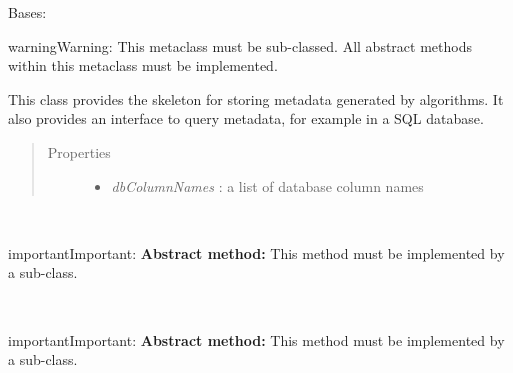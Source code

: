 \documentclass[letterpaper,10pt,english]{sphinxmanual}
\begin{document}
\begin{fulllineitems}
\label{api-doc/mosaic.meta:mosaic.metaMDIO.metaMDIO}
Bases: \href{http://docs.python.org/library/functions.html\#object}{}

\begin{notice}{warning}{Warning:}
This metaclass must be sub-classed. All abstract methods within this metaclass must be implemented.
\end{notice}

This class provides the skeleton for storing metadata
generated by algorithms. It also provides an interface to query metadata, for example in a 
SQL database.
\begin{quote}\begin{description}
\item[{Properties}] \leavevmode\begin{itemize}
\item {} 
\emph{dbColumnNames} : a list of database column names

\end{itemize}

\end{description}\end{quote}

\begin{fulllineitems}
\label{api-doc/mosaic.meta:mosaic.metaMDIO.metaMDIO._opendb}~
\begin{notice}{important}{Important:}
\textbf{Abstract method:} This method must be implemented by a sub-class.
\end{notice}

\end{fulllineitems}


\begin{fulllineitems}
\label{api-doc/mosaic.meta:mosaic.metaMDIO.metaMDIO._initdb}~
\begin{notice}{important}{Important:}
\textbf{Abstract method:} This method must be implemented by a sub-class.
\end{notice}

\end{fulllineitems}


\end{fulllineitems}
\end{document}
